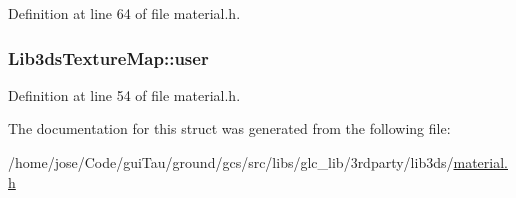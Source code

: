 Definition at line 64 of file material.\-h.

\hypertarget{struct_lib3ds_texture_map_ab99fff459d1d3b3f122868a8dd7f0397}{
\subsubsection[{user}]{ Lib3ds\-Texture\-Map\-::user}}\label{struct_lib3ds_texture_map_ab99fff459d1d3b3f122868a8dd7f0397}


Definition at line 54 of file material.\-h.



The documentation for this struct was generated from the following file\-:\begin{DoxyCompactItemize}
\item 
/home/jose/\-Code/gui\-Tau/ground/gcs/src/libs/glc\-\_\-lib/3rdparty/lib3ds/\hyperlink{material_8h}{material.\-h}\end{DoxyCompactItemize}
